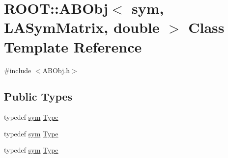 \hypertarget{classROOT_1_1Minuit2_1_1ABObj_3_01sym_00_01LASymMatrix_00_01double_01_4}{}\section{R\+O\+OT\+:\+:A\+B\+Obj$<$ sym, L\+A\+Sym\+Matrix, double $>$ Class Template Reference}
\label{classROOT_1_1Minuit2_1_1ABObj_3_01sym_00_01LASymMatrix_00_01double_01_4}


{\ttfamily \#include $<$A\+B\+Obj.\+h$>$}

\subsection*{Public Types}
\begin{DoxyCompactItemize}
\item 
typedef \mbox{\hyperlink{classROOT_1_1Minuit2_1_1sym}{sym}} \mbox{\hyperlink{classROOT_1_1Minuit2_1_1ABObj_3_01sym_00_01LASymMatrix_00_01double_01_4_ac7186d69c32b1e8a607ae45125e869c0}{Type}}
\item 
typedef \mbox{\hyperlink{classROOT_1_1Minuit2_1_1sym}{sym}} \mbox{\hyperlink{classROOT_1_1Minuit2_1_1ABObj_3_01sym_00_01LASymMatrix_00_01double_01_4_ac7186d69c32b1e8a607ae45125e869c0}{Type}}
\item 
typedef \mbox{\hyperlink{classROOT_1_1Minuit2_1_1sym}{sym}} \mbox{\hyperlink{classROOT_1_1Minuit2_1_1ABObj_3_01sym_00_01LASymMatrix_00_01double_01_4_ac7186d69c32b1e8a607ae45125e869c0}{Type}}
\end{DoxyCompactItemize}
